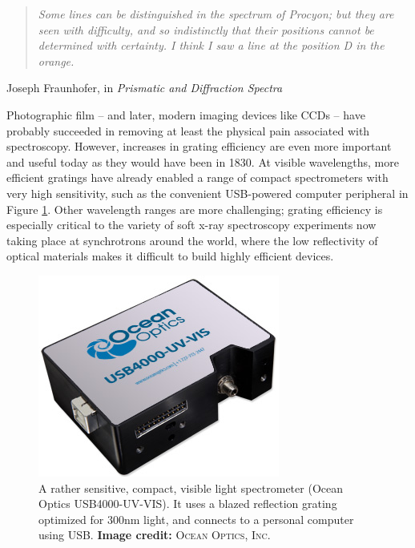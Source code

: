 \begin{quote}
\emph{Some lines can be distinguished in the spectrum of \emph{Procyon}; but they are seen with difficulty, and so indistinctly that their positions cannot be determined with certainty.  I \emph{think} I saw a line at the position D in the orange.}
\end{quote}
\begin{flushright}
Joseph Fraunhofer, in \emph{Prismatic and Diffraction Spectra} \cite[p.~61]{Fra98}
\end{flushright}

Photographic film -- and later, modern imaging devices like CCDs --  have probably succeeded in removing at least the physical pain associated with spectroscopy.  However, increases in grating efficiency are even more important and useful today as they would have been in 1830.  At visible wavelengths, more efficient gratings have already enabled a range of compact spectrometers with very high sensitivity, such as the convenient USB-powered computer peripheral in Figure \ref{1a}.  Other wavelength ranges are more challenging; grating efficiency is especially critical to the variety of soft x-ray spectroscopy experiments now taking place at synchrotrons around the world, where the low reflectivity of optical materials makes it difficult to build highly efficient devices.

\begin{figure}[htbp] %
   \centering
   \includegraphics[scale=0.5]{../data/Chapter1/1a_oceanOptics/1a.jpg} 
   \caption{A rather sensitive, compact, visible light spectrometer (Ocean Optics USB4000-UV-VIS).  It uses a blazed reflection grating optimized for 300nm light, and connects to a personal computer using USB.  \textbf{Image credit: }\textsc{Ocean Optics, Inc.} \cite{Oce11}}
   \label{1a}
\end{figure}

